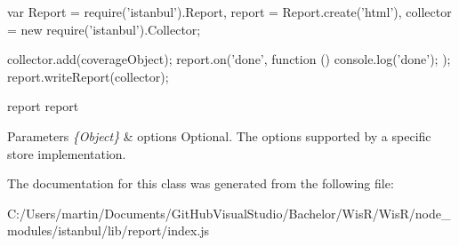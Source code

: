 \begin{DoxyVerb} var Report = require('istanbul').Report,
     report = Report.create('html'),
     collector = new require('istanbul').Collector;

 collector.add(coverageObject);
 report.on('done', function () { console.log('done'); });
 report.writeReport(collector);
\end{DoxyVerb}


report  report 


\begin{DoxyParams}{Parameters}
{\em \{\+Object\}} & options Optional. The options supported by a specific store implementation. \\
\hline
\end{DoxyParams}


The documentation for this class was generated from the following file\+:\begin{DoxyCompactItemize}
\item 
C\+:/\+Users/martin/\+Documents/\+Git\+Hub\+Visual\+Studio/\+Bachelor/\+Wis\+R/\+Wis\+R/node\+\_\+modules/istanbul/lib/report/index.\+js\end{DoxyCompactItemize}
